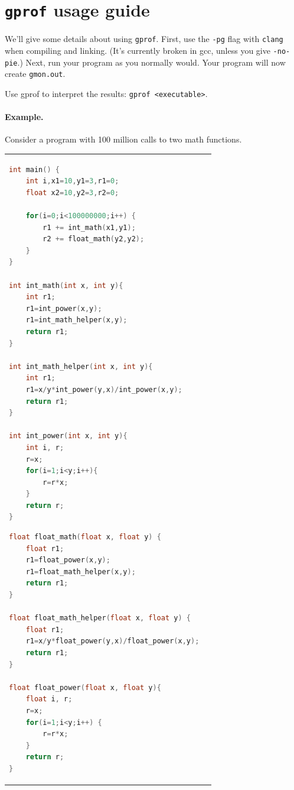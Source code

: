 \documentclass[a4paper]{report}
\begin{document}
\section*{{\tt gprof} usage guide}
We'll give some details about using {\tt gprof}. First,
use the {\tt -pg} flag with {\tt clang} when compiling and linking.
(It's currently broken in gcc, unless you give {\tt -no-pie}.)
Next, run your program as you normally would.
 Your program will now create {\tt gmon.out}.

Use gprof to interpret the results: {\tt gprof <executable>}.

\paragraph*{Example.} Consider a program with 100 million calls 
to two math functions.

\begin{tabular}{ll}
\begin{minipage}{.5\textwidth}
\begin{lstlisting}[language=C,basicstyle=\scriptsize]
int main() {
    int i,x1=10,y1=3,r1=0;
    float x2=10,y2=3,r2=0;

    for(i=0;i<100000000;i++) {
        r1 += int_math(x1,y1);
        r2 += float_math(y2,y2);
    }
}

int int_math(int x, int y){
    int r1;
    r1=int_power(x,y);
    r1=int_math_helper(x,y);
    return r1;
}

int int_math_helper(int x, int y){
    int r1;
    r1=x/y*int_power(y,x)/int_power(x,y);
    return r1;
}

int int_power(int x, int y){
    int i, r;
    r=x;
    for(i=1;i<y;i++){
        r=r*x;
    }
    return r;
}
\end{lstlisting}
\end{minipage}
\begin{minipage}{0.5\textwidth}
\begin{lstlisting}[language=C]
float float_math(float x, float y) {
    float r1;
    r1=float_power(x,y);
    r1=float_math_helper(x,y);
    return r1;
}

float float_math_helper(float x, float y) {
    float r1;
    r1=x/y*float_power(y,x)/float_power(x,y);
    return r1;
}

float float_power(float x, float y){
    float i, r;
    r=x;
    for(i=1;i<y;i++) {
        r=r*x;
    }
    return r;
}
  \end{lstlisting}
\end{minipage}
\end{tabular}
\end{document}

